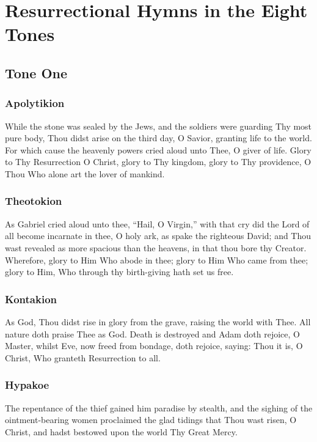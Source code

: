 \section{Resurrectional Hymns in the Eight Tones} \label{resurrectional}

\subsection{Tone One}

\subsubsection{Apolytikion}

While the stone was sealed by the Jews, and the soldiers were guarding Thy most pure body, Thou didst arise on the third day, O Savior, granting life to the world. For which cause the heavenly powers cried aloud unto Thee, O giver of life. Glory to Thy Resurrection O Christ, glory to Thy kingdom, glory to Thy providence, O Thou Who alone art the lover of mankind.

\subsubsection{Theotokion}

As Gabriel cried aloud unto thee, “Hail, O Virgin,” with that cry did the Lord of all become incarnate in thee, O holy ark, as spake the righteous David; and Thou wast revealed as more spacious than the heavens, in that thou bore thy Creator. Wherefore, glory to Him Who abode in thee; glory to Him Who came from thee; glory to Him, Who through thy birth-giving hath set us free.

\subsubsection{Kontakion}

As God, Thou didst rise in glory from the grave, raising the world with Thee. All nature doth praise Thee as God. Death is destroyed and Adam doth rejoice, O Master, whilst Eve, now freed from bondage, doth rejoice, saying: Thou it is, O Christ, Who granteth Resurrection to all.

\subsubsection{Hypakoe}

The repentance of the thief gained him paradise by stealth, and the sighing of the ointment-bearing women proclaimed the glad tidings that Thou wast risen, O Christ, and hadst bestowed upon the world Thy Great Mercy.

